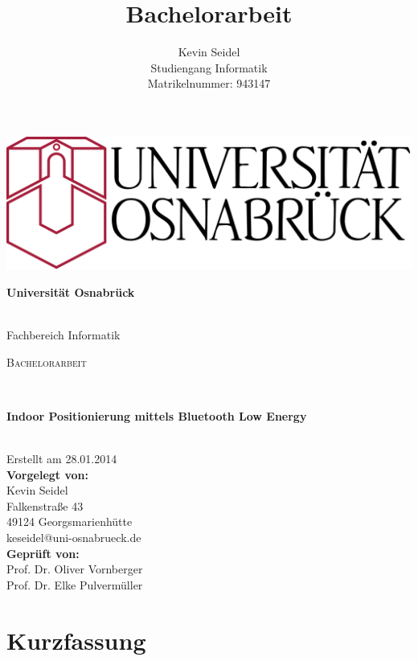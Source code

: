 \documentclass[liststotoc,a4paper, 12pt]{scrartcl}
\title{Bachelorarbeit}
\author{Kevin Seidel \\ Studiengang Informatik \\ Matrikelnummer: 943147}
\begin{document}
\begin{titlepage}
\begin{center}
	
\includegraphics[scale=0.1]{pictures/uos_logo.png}\\
\vspace*{1.5cm}
\begin{Large}
\textbf{Universität Osnabrück}
\end{Large}

\noindent\hrulefill
\\[0.25cm]
Fachbereich Informatik \\[3.5cm]
\begin{large}\textsc{Bachelorarbeit}\end{large} \\[2cm]
\begin{huge}\textbf{Indoor Positionierung mittels Bluetooth Low Energy} \end{huge} \\[1.5cm]
Erstellt am 28.01.2014
\\[3.5cm]
\textbf{Vorgelegt von:} \\
Kevin Seidel \\
Falkenstraße 43 \\
49124 Georgsmarienhütte \\
keseidel@uni-osnabrueck.de
\\[1cm]
\textbf{Geprüft von:} \\
Prof. Dr. Oliver Vornberger \\
Prof. Dr. Elke Pulvermüller

\end{center}
\end{titlepage}


\newpage

\setcounter{page}{1}

\setcounter{secnumdepth}{-2}
\section*{Kurzfassung}%
%
\end{document}
